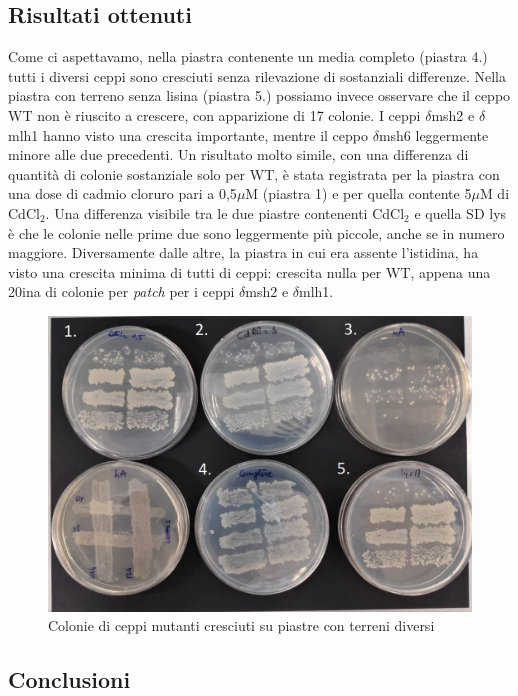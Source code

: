  \subsection{Risultati ottenuti}
	Come ci aspettavamo, nella piastra contenente un media completo (piastra 4.) tutti i diversi ceppi sono cresciuti senza rilevazione di sostanziali differenze. Nella piastra con terreno senza lisina (piastra 5.) possiamo invece osservare che il ceppo WT non è riuscito a crescere, con apparizione di 17 colonie. I ceppi $\delta$msh2 e $\delta$mlh1 hanno visto una crescita importante, mentre il ceppo $\delta$msh6 leggermente minore alle due precedenti. Un risultato molto simile, con una differenza di quantità di colonie sostanziale solo per WT, è stata registrata per la piastra con una dose di cadmio cloruro pari a 0,5$\mu$M (piastra 1) e per quella contente 5$\mu$M di CdCl$_{2}$. Una differenza visibile tra le due piastre contenenti CdCl$_{2}$ e quella SD lys è che le colonie nelle prime due sono leggermente più piccole, anche se in numero maggiore. Diversamente dalle altre, la piastra in cui era assente l'istidina, ha visto una crescita minima di tutti di ceppi: crescita nulla per WT, appena una 20ina di colonie per \textit{patch} per i ceppi $\delta$msh2 e $\delta$mlh1. 
	
 \begin{figure}[H]
	\centering
    \includegraphics[scale=0.4]{./Pics/geneambientemod1.jpg}
	\caption{Colonie di ceppi mutanti cresciuti su piastre con terreni diversi}
	\label{fig1}
	\end{figure}
 
 
 \subsection{Conclusioni}
 
